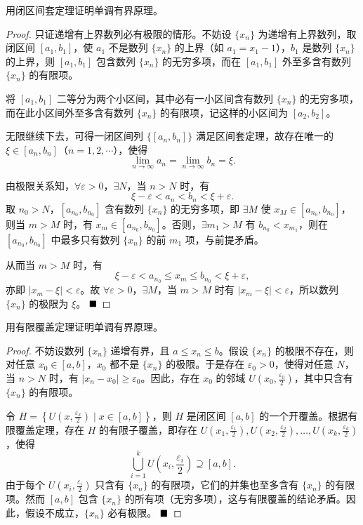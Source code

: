 \begin{problem}
    用闭区间套定理证明单调有界原理。
\end{problem}

\begin{proof}
    只证递增有上界数列必有极限的情形。不妨设 $\{x_n\}$ 为递增有上界数列，取闭区间 $[a_1, b_1]$，使 $a_1$ 不是数列 $\{x_n\}$ 的上界（如 $a_1 = x_1 - 1$），$b_1$ 是数列 $\{x_n\}$ 的上界，则 $[a_1, b_1]$ 包含数列 $\{x_n\}$ 的无穷多项，而在 $[a_1, b_1]$ 外至多含有数列 $\{x_n\}$ 的有限项。
    
    将 $[a_1, b_1]$ 二等分为两个小区间，其中必有一小区间含有数列 $\{x_n\}$ 的无穷多项，而在此小区间外至多含有数列 $\{x_n\}$ 的有限项，记这样的小区间为 $[a_2, b_2]$。
    
    无限继续下去，可得一闭区间列 $\{[a_n, b_n]\}$ 满足区间套定理，故存在唯一的 $\xi \in [a_n, b_n]$（$n = 1, 2, \cdots$），使得
    $$
    \lim\limits_{n \to \infty} a_n = \lim\limits_{n \to \infty} b_n = \xi.
    $$
    
    由极限关系知，$\forall \varepsilon > 0$，$\exists N$，当 $n > N$ 时，有
    $$
    \xi - \varepsilon < a_n < b_n < \xi + \varepsilon.
    $$
    取 $n_0 > N$，$[a_{n_0}, b_{n_0}]$ 含有数列 $\{x_n\}$ 的无穷多项，即 $\exists M$ 使 $x_M \in [a_{n_0}, b_{n_0}]$，则当 $m > M$ 时，有 $x_m \in [a_{n_0}, b_{n_0}]$。否则，$\exists m_1 > M$ 有 $b_{n_0} < x_{m_1}$，则在 $[a_{n_0}, b_{n_0}]$ 中最多只有数列 $\{x_n\}$ 的前 $m_1$ 项，与前提矛盾。
    
    从而当 $m > M$ 时，有
    $$
    \xi - \varepsilon < a_{n_0} \leq x_m \leq b_{n_0} < \xi + \varepsilon,
    $$
    亦即 $|x_m - \xi| < \varepsilon$。故 $\forall \varepsilon > 0$，$\exists M$，当 $m > M$ 时有 $|x_m - \xi| < \varepsilon$，所以数列 $\{x_n\}$ 的极限为 $\xi$。 $\hfill\blacksquare$
\end{proof}

\begin{problem}
    用有限覆盖定理证明单调有界原理。
\end{problem}

\begin{proof}
    不妨设数列 $\{x_n\}$ 递增有界，且 $a \leq x_n \leq b$。假设 $\{x_n\}$ 的极限不存在，则对任意 $x_0 \in [a,b]$，$x_0$ 都不是 $\{x_n\}$ 的极限。于是存在 $\varepsilon_0 > 0$，使得对任意 $N$，当 $n > N$ 时，有 $|x_n - x_0| \geq \varepsilon_0$。因此，存在 $x_0$ 的邻域 $U\left(x_0, \frac{\varepsilon_0}{2}\right)$，其中只含有 $\{x_n\}$ 的有限项。
    
    令 $H = \left\{ U\left(x, \frac{\varepsilon_x}{2}\right) \mid x \in [a,b] \right\}$，则 $H$ 是闭区间 $[a,b]$ 的一个开覆盖。根据有限覆盖定理，存在 $H$ 的有限子覆盖，即存在 $U\left(x_1, \frac{\varepsilon_1}{2}\right), U\left(x_2, \frac{\varepsilon_2}{2}\right), \ldots, U\left(x_k, \frac{\varepsilon_k}{2}\right)$，使得
    $$
    \bigcup_{i=1}^k U\left(x_i, \frac{\varepsilon_i}{2}\right) \supseteq [a,b].
    $$
    由于每个 $U\left(x_i, \frac{\varepsilon_i}{2}\right)$ 只含有 $\{x_n\}$ 的有限项，它们的并集也至多含有 $\{x_n\}$ 的有限项。然而 $[a,b]$ 包含 $\{x_n\}$ 的所有项（无穷多项），这与有限覆盖的结论矛盾。因此，假设不成立，$\{x_n\}$ 必有极限。 $\hfill\blacksquare$
\end{proof}

